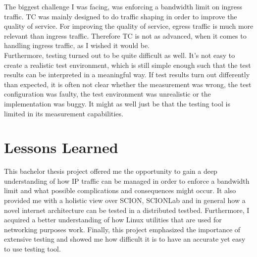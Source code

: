 The biggest challenge I was facing, was enforcing a bandwidth limit on ingress traffic. \acs{TC} was mainly designed to do traffic shaping in order to improve the quality of service. For improving the quality of service, egress traffic is much more relevant than ingress traffic. Therefore \acs{TC} is not as advanced, when it comes to handling ingress traffic, as I wished it would be.
\\
Furthermore, testing turned out to be quite difficult as well. It's not easy to create a realistic test environment, which is still simple enough such that the test results can be interpreted in a meaningful way. If test results turn out differently than expected, it is often not clear whether the measurement was wrong, the test configuration was faulty, the test environment was unrealistic or the implementation was buggy. It might as well just be that the testing tool is limited in its measurement capabilities. 

\section{Lessons Learned}

This bachelor thesis project offered me the opportunity to gain a deep understanding of how \acs{IP} traffic can be managed in order to enforce a bandwidth limit and what possible complications and consequences might occur. It also provided me with a holistic view over \acs{SCION}, \acs{SCIONLab} and in general how a novel internet architecture can be tested in a distributed testbed. Furthermore, I acquired a better understanding of how Linux utilities that are used for networking purposes work. Finally, this project emphasized the importance of extensive testing and showed me how difficult it is to have an accurate yet easy to use testing tool.